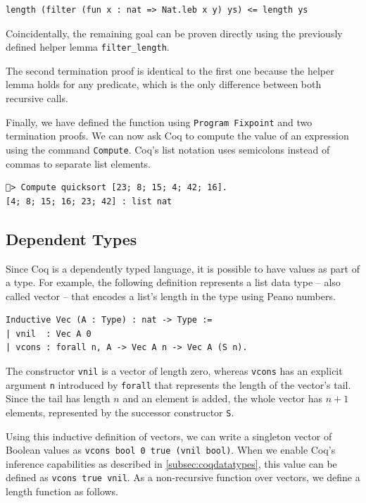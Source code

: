 \documentclass[a4paper, 11pt, fleqn, twoside, abstract=on]{scrreprt}
\newcommand{\cinl}[1]{\texttt{#1}}
\begin{document}
\begin{verbatim}
length (filter (fun x : nat => Nat.leb x y) ys) <= length ys
\end{verbatim}
\noindent
Coincidentally, the remaining goal can be proven directly using the previously defined helper lemma \cinl{filter_length}.

The second termination proof is identical to the first one because the helper lemma holds for any predicate, which is the only difference between both recursive calls.

Finally, we have defined the function using \cinl{Program Fixpoint} and two termination proofs.
We can now ask Coq to compute the value of an expression using the command \cinl{Compute}.
Coq's list notation uses semicolons instead of commas to separate list elements.

\begin{verbatim}
🐔> Compute quicksort [23; 8; 15; 4; 42; 16].
[4; 8; 15; 16; 23; 42] : list nat
\end{verbatim}

\subsection{Dependent Types}
\label{subsec:dependent}

Since Coq is a dependently typed language, it is possible to have values as part of a type.
For example, the following definition represents a list data type -- also called vector -- that encodes a list's length in the type using Peano numbers.

\begin{verbatim}
Inductive Vec (A : Type) : nat -> Type :=
| vnil  : Vec A 0
| vcons : forall n, A -> Vec A n -> Vec A (S n).
\end{verbatim}

The constructor \cinl{vnil} is a vector of length zero, whereas \cinl{vcons} has an explicit argument \cinl{n} introduced by \cinl{forall} that represents the length of the vector's tail.
Since the tail has length $n$ and an element is added, the whole vector has $n + 1$ elements, represented by the successor constructor \cinl{S}.

Using this inductive definition of vectors, we can write a singleton vector of Boolean values as \cinl{vcons bool 0 true (vnil bool)}.
When we enable Coq's inference capabilities as described in \autoref{subsec:coqdatatypes}, this value can be defined as \cinl{vcons true vnil}.
As a non-recursive function over vectors, we define a length function as follows.
\end{document}

